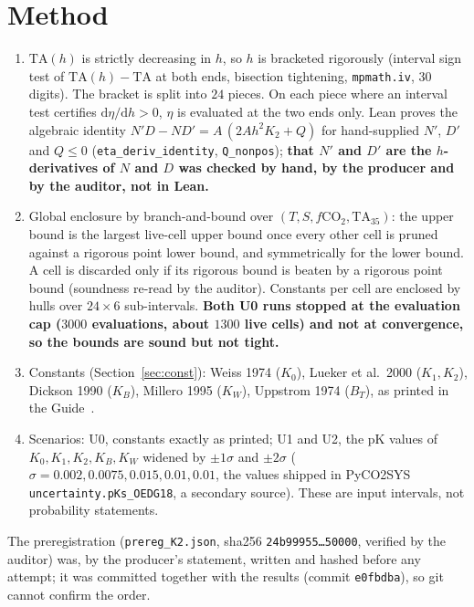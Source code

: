 \documentclass[10pt]{article}
\newcommand{\lean}[1]{\texttt{#1}}
\begin{document}
\section{Method}\label{sec:method}
\begin{enumerate}\itemsep=1pt
\item $\mathrm{TA}(h)$ is strictly decreasing in $h$, so $h$ is bracketed rigorously (interval sign test of $\mathrm{TA}(h)-\mathrm{TA}$ at both ends, bisection tightening, \texttt{mpmath.iv}, 30 digits). The bracket is split into $24$ pieces. On each piece where an interval test certifies $\mathrm d\eta/\mathrm dh>0$, $\eta$ is evaluated at the two ends only. Lean proves the algebraic identity $N'D-ND'=A\,(2Ah^2K_2+Q)$ for hand-supplied $N'$, $D'$ and $Q\le0$ (\lean{eta\_deriv\_identity}, \lean{Q\_nonpos}); \textbf{that $N'$ and $D'$ are the $h$-derivatives of $N$ and $D$ was checked by hand, by the producer and by the auditor, not in Lean.}
\item Global enclosure by branch-and-bound over $(T,S,f\mathrm{CO_2},\mathrm{TA}_{35})$: the upper bound is the largest live-cell upper bound once every other cell is pruned against a rigorous point lower bound, and symmetrically for the lower bound. A cell is discarded only if its rigorous bound is beaten by a rigorous point bound (soundness re-read by the auditor). Constants per cell are enclosed by hulls over $24\times6$ sub-intervals. \textbf{Both U0 runs stopped at the evaluation cap ($3000$ evaluations, about $1300$ live cells) and not at convergence, so the bounds are sound but not tight.}
\item Constants (Section~\ref{sec:const}): Weiss 1974 ($K_0$), Lueker et al.\ 2000 ($K_1,K_2$), Dickson 1990 ($K_B$), Millero 1995 ($K_W$), Uppstrom 1974 ($B_T$), as printed in the Guide~\cite{guide}.
\item Scenarios: U0, constants exactly as printed; U1 and U2, the pK values of $K_0,K_1,K_2,K_B,K_W$ widened by $\pm1\sigma$ and $\pm2\sigma$ ($\sigma=0.002,0.0075,0.015,0.01,0.01$, the values shipped in PyCO2SYS \texttt{uncertainty.pKs\_OEDG18}, a secondary source). These are input intervals, not probability statements.
\end{enumerate}
The preregistration (\texttt{prereg\_K2.json}, sha256 \texttt{24b99955\dots50000}, verified by the auditor) was, by the producer's statement, written and hashed before any attempt; it was committed together with the results (commit \texttt{e0fbdba}), so git cannot confirm the order.

\end{document}
